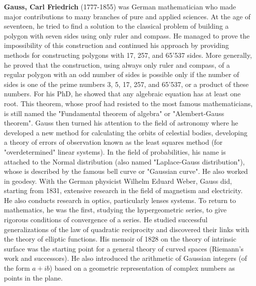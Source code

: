 \textbf{Gauss, Carl Friedrich} (1777-1855) was German mathematician who made major contributions to many branches of pure and applied sciences. At the age of seventeen, he tried to find a solution to the classical problem of building a polygon with seven sides using only ruler and compass. He managed to prove the impossibility of this construction and continued his approach by providing methods for constructing polygons with 17, 257, and 65'537 sides. More generally, he proved that the construction, using always only ruler and compass, of a regular polygon with an odd number of sides is possible only if the number of sides is one of the prime numbers 3, 5, 17, 257, and 65'537, or a product of these numbers. For his PhD, he showed that any algebraic equation has at least one root. This theorem, whose proof had resisted to the most famous mathematicians, is still named the "Fundamental theorem of algebra" or "Alembert-Gauss theorem". Gauss then turned his attention to the field of astronomy where he developed a new method for calculating the orbits of celestial bodies, developing a theory of errors of observation known as the least squares method (for "overdetermined" linear systems). In the field of probabilities, his name is attached to the Normal distribution (also named "Laplace-Gauss distribution"), whose is described by the famous bell curve or "Gaussian curve". He also worked in geodesy. With the German physicist Wilhelm Eduard Weber, Gauss did, starting from 1831, extensive research in the field of magnetism and electricity. He also conducts research in optics, particularly lenses systems. To return to mathematics, he was the first, studying the hypergeometric series, to give rigorous conditions of convergence of a series. He studied successful generalizations of the law of quadratic reciprocity and discovered their links with the theory of elliptic functions. His memoir of 1828 on the theory of intrinsic surface was the starting point for a general theory of curved spaces (Riemann's work and successors). He also introduced the arithmetic of Gaussian integers (of the form $a+ib$) based on a geometric representation of complex numbers as points in the plane.


